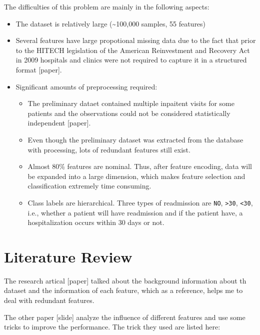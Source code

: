 \documentclass[]{article}
\begin{document}
The difficulties of this problem are mainly in the following aspects:

\begin{itemize}
\itemsep1pt\parskip0pt
\item
  The dataset is relatively large (\textasciitilde{}100,000 samples, 55
  features)
\item
  Several features have large propotional missing data due to the fact
  that prior to the HITECH legislation of the American Reinvestment and
  Recovery Act in 2009 hospitals and clinics were not required to
  capture it in a structured format {[}paper{]}.
\item
  Significant amounts of preprocessing required:

  \begin{itemize}
  \itemsep1pt\parskip0pt
  \item
    The preliminary dataet contained multiple inpaitent visits for some
    patients and the observations could not be considered statistically
    independent {[}paper{]}.
  \item
    Even though the preliminary dataset was extracted from the database
    with processing, lots of redundant features still exist.
  \item
    Almost 80\% features are nominal. Thus, after feature encoding, data
    will be expanded into a large dimension, which makes feature
    selection and classification extremely time consuming.
  \item
    Class labels are hierarchical. Three types of readmission are
    \texttt{NO}, \texttt{\textgreater{}30}, \texttt{\textless{}30},
    i.e., whether a patient will have readmission and if the patient
    have, a hospitalization occurs within 30 days or not.
  \end{itemize}
\end{itemize}

\section{Literature Review}\label{literature-review}

The research artical {[}paper{]} talked about the background information
about th dataset and the information of each feature, which as a
reference, helps me to deal with redundant features.

The other paper {[}slide{]} analyze the influence of different features
and use some tricks to improve the performance. The trick they used are
listed here:
\end{document}
